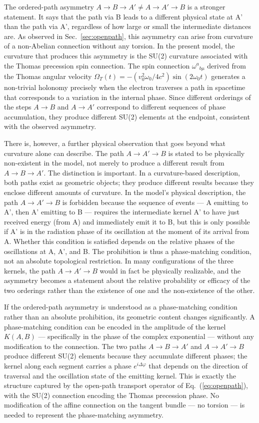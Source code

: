 \documentclass[%
 reprint,
 amsmath,amssymb,
 aps,
 prb,
]{revtex4-2}
\numberwithin{equation}{section}
\newcommand{\KAB}{K(A,B)}
\newcommand{\OmT}{\Omega_{T}}
\begin{document}
The ordered-path asymmetry $A\to B\to A' \neq A\to A'\to B$ is a stronger statement. It says that the path via B leads to a different physical state at A' than the path via A', regardless of how large or small the intermediate distances are. As observed in Sec.~\ref{sec:openpath}, this asymmetry can arise from curvature of a non-Abelian connection without any torsion. In the present model, the curvature that produces this asymmetry is the SU(2) curvature associated with the Thomas precession spin connection. The spin connection $\omega^a{}_{b\mu}$ derived from the Thomas angular velocity $\OmT(t) = -(v_0^2\omega_0/4c^2)\sin(2\omega_0 t)$ generates a non-trivial holonomy precisely when the electron traverses a path in spacetime that corresponds to a variation in the internal phase. Since different orderings of the steps $A\to B$ and $A\to A'$ correspond to different sequences of phase accumulation, they produce different SU(2) elements at the endpoint, consistent with the observed asymmetry.

There is, however, a further physical observation that goes beyond what curvature alone can describe. The path $A\to A'\to B$ is stated to be physically non-existent in the model, not merely to produce a different result from $A\to B\to A'$. The distinction is important. In a curvature-based description, both paths exist as geometric objects; they produce different results because they enclose different amounts of curvature. In the model's physical description, the path $A\to A'\to B$ is forbidden because the sequence of events --- A emitting to A', then A' emitting to B --- requires the intermediate kernel A' to have just received energy (from A) and immediately emit it to B, but this is only possible if A' is in the radiation phase of its oscillation at the moment of its arrival from A. Whether this condition is satisfied depends on the relative phases of the oscillations at A, A', and B. The prohibition is thus a phase-matching condition, not an absolute topological restriction. In many configurations of the three kernels, the path $A\to A'\to B$ would in fact be physically realizable, and the asymmetry becomes a statement about the relative probability or efficacy of the two orderings rather than the existence of one and the non-existence of the other.

If the ordered-path asymmetry is understood as a phase-matching condition rather than an absolute prohibition, its geometric content changes significantly. A phase-matching condition can be encoded in the amplitude of the kernel $\KAB$ --- specifically in the phase of the complex exponential --- without any modification to the connection. The two paths $A\to B\to A'$ and $A\to A'\to B$ produce different SU(2) elements because they accumulate different phases; the kernel along each segment carries a phase $e^{i\Delta\varphi}$ that depends on the direction of traversal and the oscillation state of the emitting kernel. This is exactly the structure captured by the open-path transport operator of Eq.~(\ref{eq:openpath}), with the SU(2) connection encoding the Thomas precession phase. No modification of the affine connection on the tangent bundle --- no torsion --- is needed to represent the phase-matching asymmetry.
\end{document}

